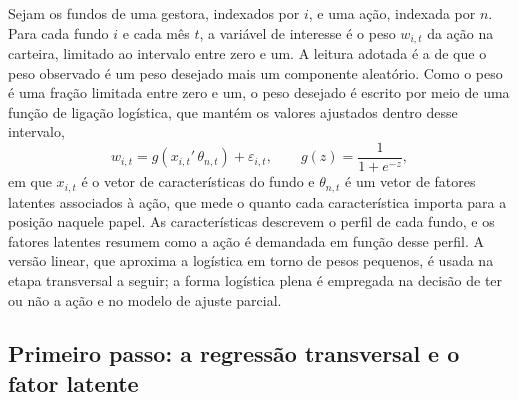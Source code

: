 \documentclass[12pt,a4paper]{article}
\begin{document}
Sejam os fundos de uma gestora, indexados por $i$, e uma ação, indexada por $n$. Para cada
fundo $i$ e cada mês $t$, a variável de interesse é o peso $w_{i,t}$ da ação na carteira,
limitado ao intervalo entre zero e um. A leitura adotada é a de que o peso observado é um
peso desejado mais um componente aleatório. Como o peso é uma fração limitada entre zero e um,
o peso desejado é escrito por meio de uma função de ligação logística, que mantém os valores
ajustados dentro desse intervalo,
\begin{equation}
w_{i,t} = g\!\left(x_{i,t}'\,\theta_{n,t}\right) + \varepsilon_{i,t}, \qquad g(z)=\frac{1}{1+e^{-z}},
\label{eq:target}
\end{equation}
em que $x_{i,t}$ é o vetor de características do fundo e $\theta_{n,t}$ é um vetor de fatores
latentes associados à ação, que mede o quanto cada característica importa para a posição
naquele papel. As características descrevem o perfil de cada fundo, e os fatores latentes
resumem como a ação é demandada em função desse perfil. A versão linear, que aproxima a
logística em torno de pesos pequenos, é usada na etapa transversal a seguir; a forma logística
plena é empregada na decisão de ter ou não a ação e no modelo de ajuste parcial.

\subsection{Primeiro passo: a regressão transversal e o fator latente}
\end{document}
